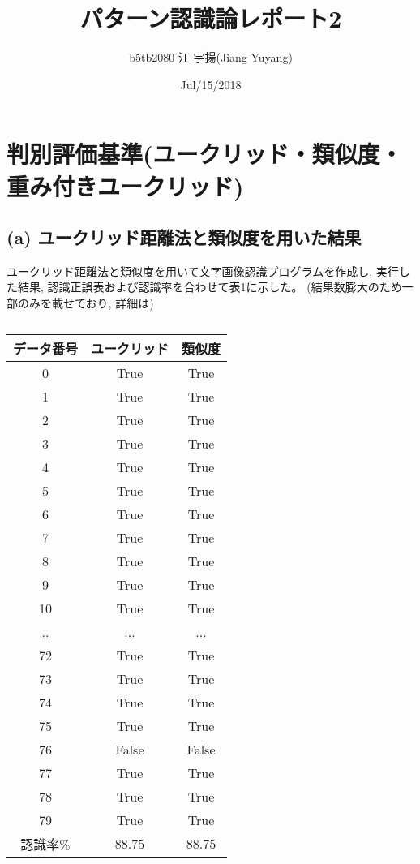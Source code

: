 \documentclass[twocolumn, 10.5pt]{jsarticle}
\title{パターン認識論レポート2}
\date{Jul/15/2018}
\author{b5tb2080 江 宇揚(Jiang Yuyang)}
\begin{document}
\maketitle
{}

\section{判別評価基準(ユークリッド・類似度・重み付きユークリッド)}
\subsection{(a) ユークリッド距離法と類似度を用いた結果}
ユークリッド距離法と類似度を用いて文字画像認識プログラムを作成し, 実行した結果, 認識正誤表および認識率を合わせて表1に示した。
(結果数膨大のため一部のみを載せており, 詳細は)
\begin{table}[htbp]
  \caption{}
  \centering
  \begin{tabular}{|c||c|c|}\hline
  データ番号 & ユークリッド & 類似度 \\\hline\hline
    0 & True & True \\\hline
    1 & True & True \\\hline
    2 & True & True \\\hline
    3 & True & True \\\hline
    4 & True & True \\\hline
    5 & True & True \\\hline
    6 & True & True \\\hline
    7 & True & True \\\hline
    8 & True & True \\\hline
    9 & True & True \\\hline
    10 & True & True \\\hline
    .. & ... & ... \\\hline
    72 & True & True \\\hline
    73 & True & True \\\hline
    74 & True & True \\\hline
    75 & True & True \\\hline
    76 & False & False \\\hline
    77 & True & True \\\hline
    78 & True & True \\\hline
    79 & True & True \\\hline\hline
    認識率\% & 88.75 & 88.75 \\\hline
  \end{tabular}

\end{table}
\end{document}
